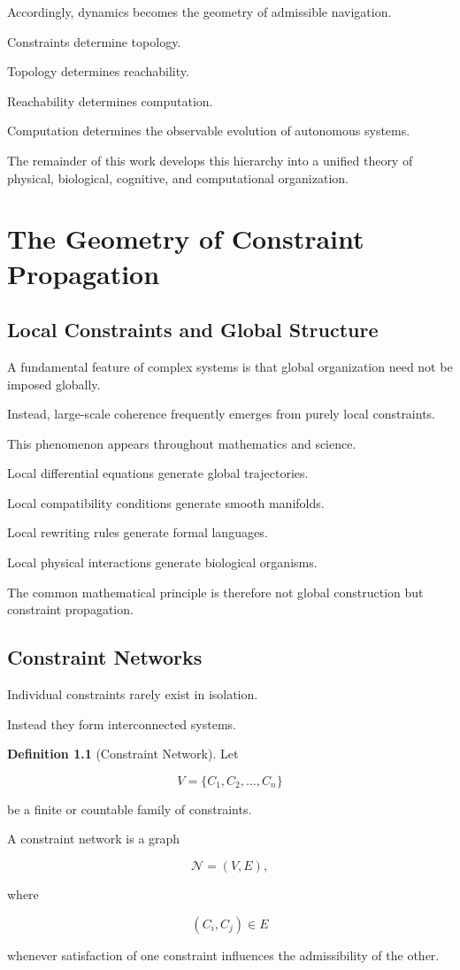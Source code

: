 \documentclass[11pt,oneside]{book}
\numberwithin{equation}{chapter}
\theoremstyle{definition}
\newtheorem{definition}{Definition}[chapter]
\theoremstyle{plain}
\begin{document}
Accordingly, dynamics becomes the geometry of admissible navigation.

Constraints determine topology.

Topology determines reachability.

Reachability determines computation.

Computation determines the observable evolution of autonomous systems.

The remainder of this work develops this hierarchy into a unified theory of
physical, biological, cognitive, and computational organization.

\chapter{The Geometry of Constraint Propagation}

\section{Local Constraints and Global Structure}

A fundamental feature of complex systems is that global organization need not
be imposed globally.

Instead, large-scale coherence frequently emerges from purely local
constraints.

This phenomenon appears throughout mathematics and science.

Local differential equations generate global trajectories.

Local compatibility conditions generate smooth manifolds.

Local rewriting rules generate formal languages.

Local physical interactions generate biological organisms.

The common mathematical principle is therefore not global construction but
constraint propagation.

\section{Constraint Networks}

Individual constraints rarely exist in isolation.

Instead they form interconnected systems.

\begin{definition}[Constraint Network]

Let

\[
V=\{C_1,C_2,\ldots,C_n\}
\]

be a finite or countable family of constraints.

A constraint network is a graph

\[
\mathcal{N}=(V,E),
\]

where

\[
(C_i,C_j)\in E
\]

whenever satisfaction of one constraint influences the admissibility of the
other.

\end{definition}
\end{document}
